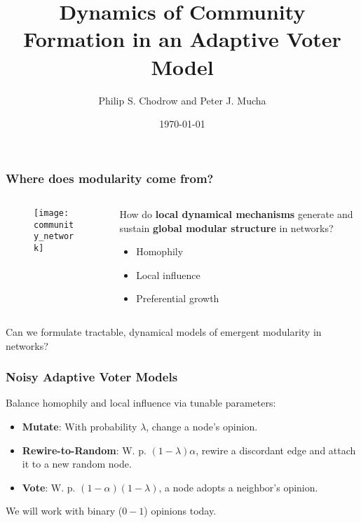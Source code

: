 \documentclass{beamer}
\title{Dynamics of Community Formation in an Adaptive Voter Model}
\date{\today}
\author{Philip S. Chodrow and Peter J. Mucha}
\institute{
	\vspace{6.4mm}
	$\vcenter{\hbox{\texttt{[image: PJM]}}}$
	\hspace*{.5cm}
	$\vcenter{\hbox{\texttt{[image: mit\_logo]}}}$
	\hspace*{.5cm}
	$\vcenter{\hbox{\texttt{[image: UNC]}}}$
	\hspace*{.5cm}
	$\vcenter{\hbox{\texttt{[image: nsf\_logo]}}}$
}
\begin{document}
\maketitle

		
		\begin{frame}\frametitle{Where does \alert{modularity} come from?}
		\begin{columns}
			\begin{column}{0.5\textwidth}
				\begin{figure}
			  		\centering
			  		\texttt{[image: community\_network]}
			  		\caption{\tiny{}} \label{fig:}
			  	\end{figure}
			\end{column}
			\begin{column}{0.5\textwidth}
				How do \textbf{local dynamical mechanisms} generate and sustain \textbf{global modular structure} in networks? 
				\begin{itemize}
					\item Homophily
					\item Local influence
					\item Preferential growth
				\end{itemize}
			\end{column}
		\end{columns}
		\centering
		\end{frame}

		\begin{frame}[standout]
			Can we formulate \alert{tractable}, \alert{dynamical} models of emergent modularity in networks?
		\end{frame}
		
		\begin{frame}\frametitle{Noisy Adaptive Voter Models}
		  	Balance homophily and local influence via tunable parameters:  
		  	\begin{itemize}
		  		\item \textbf{Mutate}: With probability $\lambda$, change a node's opinion.
		  		\item \textbf{Rewire-to-Random}: W. p. $(1-\lambda)\alpha$, rewire a discordant edge and attach it to a new random node.
		  		\item \textbf{Vote}: W. p. $(1-\alpha)(1-\lambda)$, a node adopts a neighbor's opinion. 
		  	\end{itemize}
		  	We will work with binary ($0-1$) opinions today.
		\end{frame}
\end{document}

